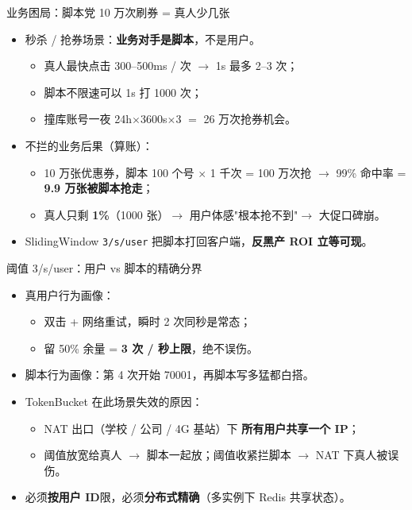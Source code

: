 \documentclass[aspectratio=169,11pt]{beamer}
\begin{document}
\begin{frame}[shrink]{业务困局：脚本党 10 万次刷券 = 真人少几张}
\begin{itemize}
  \item 秒杀 / 抢券场景：\textbf{业务对手是脚本}，不是用户。
  \begin{itemize}
    \item 真人最快点击 300--500ms / 次 $\to$ 1s 最多 2--3 次；
    \item 脚本不限速可以 1s 打 1000 次；
    \item 撞库账号一夜 24h$\times$3600s$\times$3 $=$ 26 万次抢券机会。
  \end{itemize}
  \item 不拦的业务后果（算账）：
  \begin{itemize}
    \item 10 万张优惠券，脚本 100 个号 $\times$ 1 千次 = 100 万次抢 $\to$ 99\% 命中率 = \textbf{9.9 万张被脚本抢走}；
    \item 真人只剩 \textbf{1\%}（1000 张）$\to$ 用户体感"根本抢不到"$\to$ 大促口碑崩。
  \end{itemize}
  \item SlidingWindow \texttt{3/s/user} 把脚本打回客户端，\textbf{反黑产 ROI 立等可现}。
\end{itemize}
\end{frame}

\begin{frame}[shrink]{阈值 3/s/user：用户 vs 脚本的精确分界}
\begin{itemize}
  \item 真用户行为画像：
  \begin{itemize}
    \item 双击 + 网络重试，瞬时 2 次同秒是常态；
    \item 留 50\% 余量 = \textbf{3 次 / 秒上限}，绝不误伤。
  \end{itemize}
  \item 脚本行为画像：第 4 次开始 70001，再脚本写多猛都白搭。
  \item TokenBucket 在此场景失效的原因：
  \begin{itemize}
    \item NAT 出口（学校 / 公司 / 4G 基站）下 \textbf{所有用户共享一个 IP}；
    \item 阈值放宽给真人 $\to$ 脚本一起放；阈值收紧拦脚本 $\to$ NAT 下真人被误伤。
  \end{itemize}
  \item 必须\textbf{按用户 ID}限，必须\textbf{分布式精确}（多实例下 Redis 共享状态）。
\end{itemize}
\end{frame}
\end{document}
